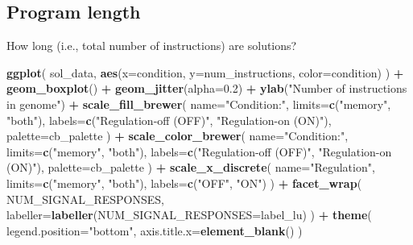 \documentclass[]{book}
\newenvironment{Shaded}{\begin{snugshade}}{\end{snugshade}}
\newcommand{\DataTypeTok}[1]{\textcolor[rgb]{0.13,0.29,0.53}{#1}}
\newcommand{\FloatTok}[1]{\textcolor[rgb]{0.00,0.00,0.81}{#1}}
\newcommand{\KeywordTok}[1]{\textcolor[rgb]{0.13,0.29,0.53}{\textbf{#1}}}
\newcommand{\NormalTok}[1]{#1}
\newcommand{\OperatorTok}[1]{\textcolor[rgb]{0.81,0.36,0.00}{\textbf{#1}}}
\newcommand{\StringTok}[1]{\textcolor[rgb]{0.31,0.60,0.02}{#1}}
\begin{document}
\hypertarget{program-length}{%
\subsection{Program length}\label{program-length}}

How long (i.e., total number of instructions) are solutions?

\begin{Shaded}
\begin{Highlighting}[]
\KeywordTok{ggplot}\NormalTok{( sol_data, }\KeywordTok{aes}\NormalTok{(}\DataTypeTok{x=}\NormalTok{condition, }\DataTypeTok{y=}\NormalTok{num_instructions, }\DataTypeTok{color=}\NormalTok{condition) ) }\OperatorTok{+}
\StringTok{  }\KeywordTok{geom_boxplot}\NormalTok{() }\OperatorTok{+}
\StringTok{  }\KeywordTok{geom_jitter}\NormalTok{(}\DataTypeTok{alpha=}\FloatTok{0.2}\NormalTok{) }\OperatorTok{+}
\StringTok{  }\KeywordTok{ylab}\NormalTok{(}\StringTok{"Number of instructions in genome"}\NormalTok{) }\OperatorTok{+}
\StringTok{  }\KeywordTok{scale_fill_brewer}\NormalTok{(}
    \DataTypeTok{name=}\StringTok{"Condition:"}\NormalTok{,}
    \DataTypeTok{limits=}\KeywordTok{c}\NormalTok{(}\StringTok{"memory"}\NormalTok{, }\StringTok{"both"}\NormalTok{),}
    \DataTypeTok{labels=}\KeywordTok{c}\NormalTok{(}\StringTok{"Regulation-off (OFF)"}\NormalTok{, }\StringTok{"Regulation-on (ON)"}\NormalTok{),}
    \DataTypeTok{palette=}\NormalTok{cb_palette}
\NormalTok{  ) }\OperatorTok{+}
\StringTok{  }\KeywordTok{scale_color_brewer}\NormalTok{(}
    \DataTypeTok{name=}\StringTok{"Condition:"}\NormalTok{,}
    \DataTypeTok{limits=}\KeywordTok{c}\NormalTok{(}\StringTok{"memory"}\NormalTok{, }\StringTok{"both"}\NormalTok{),}
    \DataTypeTok{labels=}\KeywordTok{c}\NormalTok{(}\StringTok{"Regulation-off (OFF)"}\NormalTok{, }\StringTok{"Regulation-on (ON)"}\NormalTok{),}
    \DataTypeTok{palette=}\NormalTok{cb_palette}
\NormalTok{  ) }\OperatorTok{+}
\StringTok{  }\KeywordTok{scale_x_discrete}\NormalTok{(}
    \DataTypeTok{name=}\StringTok{"Regulation"}\NormalTok{,}
    \DataTypeTok{limits=}\KeywordTok{c}\NormalTok{(}\StringTok{"memory"}\NormalTok{, }\StringTok{"both"}\NormalTok{),}
    \DataTypeTok{labels=}\KeywordTok{c}\NormalTok{(}\StringTok{"OFF"}\NormalTok{, }\StringTok{"ON"}\NormalTok{)}
\NormalTok{  ) }\OperatorTok{+}
\StringTok{  }\KeywordTok{facet_wrap}\NormalTok{(}
    \OperatorTok{~}\StringTok{ }\NormalTok{NUM_SIGNAL_RESPONSES,}
    \DataTypeTok{labeller=}\KeywordTok{labeller}\NormalTok{(}\DataTypeTok{NUM_SIGNAL_RESPONSES=}\NormalTok{label_lu)}
\NormalTok{  ) }\OperatorTok{+}
\StringTok{  }\KeywordTok{theme}\NormalTok{(}
    \DataTypeTok{legend.position=}\StringTok{"bottom"}\NormalTok{,}
    \DataTypeTok{axis.title.x=}\KeywordTok{element_blank}\NormalTok{()}
\NormalTok{  )}
\end{Highlighting}
\end{Shaded}
\end{document}

